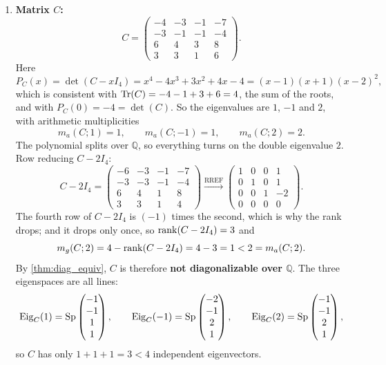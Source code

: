 \begin{exercisesolution*}
\begin{enumerate}[label=\textbf{(\alph*)}]
    \item \textbf{Matrix $C$:}
    \[
    C = \begin{pmatrix} -4 & -3 & -1 & -7 \\ -3 & -1 & -1 & -4 \\ 6 & 4 & 3 & 8 \\ 3 & 3 & 1 & 6 \end{pmatrix}.
    \]
    Here
    \[
    P_C(x) = \det(C - x I_4) = x^4 - 4x^3 + 3x^2 + 4x - 4 = (x-1)(x+1)(x-2)^2,
    \]
    which is consistent with $\operatorname{Tr}(C) = -4 - 1 + 3 + 6 = 4$, the sum of the roots, and with $P_C(0) = -4 = \det(C)$.
    So the eigenvalues are $1$, $-1$ and $2$, with arithmetic multiplicities
    \[
    m_a(C; 1) = 1, \qquad m_a(C; -1) = 1, \qquad m_a(C; 2) = 2.
    \]
    The polynomial splits over $\mathbb{Q}$, so everything turns on the double eigenvalue $2$. Row reducing $C - 2 I_4$:
    \[
    C - 2 I_4 = \begin{pmatrix} -6 & -3 & -1 & -7 \\ -3 & -3 & -1 & -4 \\ 6 & 4 & 1 & 8 \\ 3 & 3 & 1 & 4 \end{pmatrix}
    \xrightarrow{\text{RREF}}
    \begin{pmatrix} 1 & 0 & 0 & 1 \\ 0 & 1 & 0 & 1 \\ 0 & 0 & 1 & -2 \\ 0 & 0 & 0 & 0 \end{pmatrix}.
    \]
    The fourth row of $C - 2I_4$ is $(-1)$ times the second, which is why the rank drops; and it drops only once, so $\operatorname{rank}(C - 2 I_4) = 3$ and
    \[
    m_g(C; 2) = 4 - \operatorname{rank}(C - 2 I_4) = 4 - 3 = 1 < 2 = m_a(C; 2).
    \]
    By \cref{thm:diag_equiv}, $C$ is therefore \textbf{not diagonalizable over $\mathbb{Q}$}. The three eigenspaces are all lines:
    \[
    \operatorname{Eig}_C(1) = \operatorname{Sp} \begin{pmatrix} -1 \\ -1 \\ 1 \\ 1 \end{pmatrix}, \qquad
    \operatorname{Eig}_C(-1) = \operatorname{Sp} \begin{pmatrix} -2 \\ -1 \\ 2 \\ 1 \end{pmatrix}, \qquad
    \operatorname{Eig}_C(2) = \operatorname{Sp} \begin{pmatrix} -1 \\ -1 \\ 2 \\ 1 \end{pmatrix},
    \]
    so $C$ has only $1 + 1 + 1 = 3 < 4$ independent eigenvectors. \qedhere
\end{enumerate}
\end{exercisesolution*}

